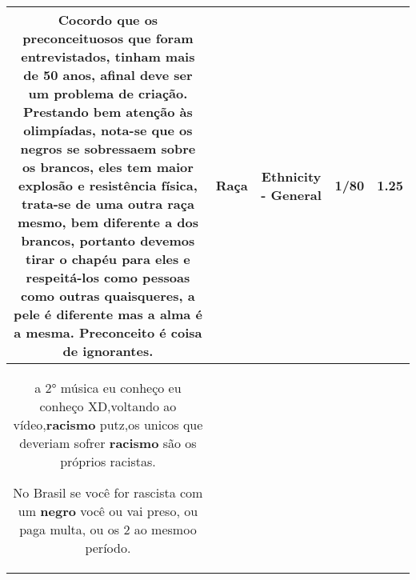 \documentclass[11pt]{article}
\newlength\mylength
\begin{document}
\begin{center}
\begin{longtable}{|C{.65\mylength}|C{.30\mylength}|C{.12\mylength}|C{.12\mylength}|C{.12\mylength}|}
  \small Cocordo que os preconceituosos que foram entrevistados, tinham mais de 50 anos, afinal deve ser um problema de criação. Prestando bem atenção às olimpíadas, nota-se que os negros se sobressaem sobre os brancos, eles tem maior explosão e resistência física, trata-se de uma outra \textbf{raça} mesmo, bem diferente a dos brancos, portanto devemos tirar o chapéu para eles e respeitá-los como pessoas como outras quaisqueres, a pele é diferente mas a alma é a mesma. Preconceito é coisa de ignorantes.\normalsize   & Raça & Ethnicity - General & 1/80 & 1.25 \\  \hline
  \small a 2° música eu conheço eu conheço XD,voltando ao vídeo,\textbf{racismo} putz,os unicos que deveriam sofrer \textbf{racismo} são os próprios racistas.

No Brasil se você for rascista com um \textbf{negro} você ou vai preso, ou paga multa, ou os 2 ao mesmoo período.


\end{longtable}
\end{center}
\end{document}
